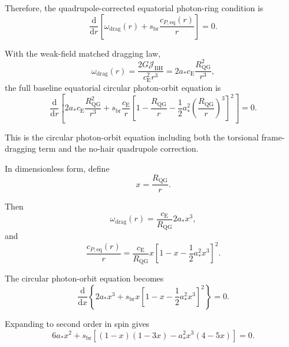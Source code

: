 Therefore, the quadrupole-corrected equatorial photon-ring condition is
\begin{equation}
    \boxed{ \frac{\mathrm{d}}{\mathrm{d}r} \left[ \omega_{\mathrm{drag}}(r) + s_{\mathrm{br}} \frac{c_{P,\mathrm{eq}}(r)}{r} \right] = 0. }
\end{equation}

With the weak-field matched dragging law,
\begin{equation}
    \omega_{\mathrm{drag}}(r) = \frac{2G\mathcal{J}_{\mathrm{BH}}}{c_{\mathrm{E}}^2r^3} = 2a_\ast c_{\mathrm{E}} \frac{R_{\mathrm{QG}}^2}{r^3},
\end{equation}
the full baseline equatorial circular photon-orbit equation is
\begin{equation}
    \boxed{ \frac{\mathrm{d}}{\mathrm{d}r} \left[ 2a_\ast c_{\mathrm{E}} \frac{R_{\mathrm{QG}}^2}{r^3} + s_{\mathrm{br}} \frac{c_{\mathrm{E}}}{r} \left[ 1 - \frac{R_{\mathrm{QG}}}{r} - \frac{1}{2} a_\ast^2 \left( \frac{R_{\mathrm{QG}}}{r} \right)^3 \right]^2 \right] = 0. }
\end{equation}

This is the circular photon-orbit equation including both the torsional frame-dragging term and the no-hair quadrupole correction.

In dimensionless form, define
\begin{equation}
    x = \frac{R_{\mathrm{QG}}}{r}.
\end{equation}

Then
\begin{equation}
    \omega_{\mathrm{drag}}(r) = \frac{c_{\mathrm{E}}}{R_{\mathrm{QG}}} 2a_\ast x^3,
\end{equation}
and
\begin{equation}
    \frac{c_{P,\mathrm{eq}}(r)}{r} = \frac{c_{\mathrm{E}}}{R_{\mathrm{QG}}} x \left[ 1 - x - \frac{1}{2}a_\ast^2x^3 \right]^2.
\end{equation}

The circular photon-orbit equation becomes
\begin{equation}
    \boxed{ \frac{\mathrm{d}}{\mathrm{d}x} \left\{ 2a_\ast x^3 + s_{\mathrm{br}} x \left[ 1 - x - \frac{1}{2}a_\ast^2x^3 \right]^2 \right\} = 0. }
\end{equation}

Expanding to second order in spin gives
\begin{equation}
    \boxed{ 6a_\ast x^2 + s_{\mathrm{br}} \left[ (1-x)(1-3x) - a_\ast^2x^3(4-5x) \right] = 0. }
\end{equation}

